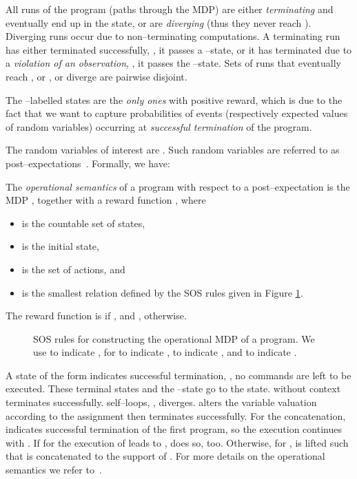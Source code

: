 All runs of the program (paths through the MDP) are either \emph{terminating} and eventually end up in the \sink state, or are \emph{diverging} (thus they never reach \sink).
Diverging runs occur due to non--terminating computations.
A terminating run has either terminated successfully, \ie, it passes a \exit--state, or it has terminated due to a \emph{violation of an observation}, \ie, it passes the --state.
Sets of runs that eventually reach \undesired, or \sink, or diverge are pairwise disjoint. 

\noindent The \exit--labelled states are the \emph{only ones} with positive reward, which is due to the fact that we want to capture probabilities of events (respectively expected values of random variables) occurring at \emph{successful termination} of the program.

The random variables of interest are .
Such random variables are referred to as post--expectations~\cite{McIver:2004}. 
Formally, we have:
\begin{definition}
The \emph{operational semantics} of a \cpGCL program  with respect to a post--expectation  is the MDP ,  together with a reward function , where
\begin{itemize}
\item is the countable set of states,
\item  is the initial state,
\item  is the set of actions, and
\item  is the smallest relation defined by the SOS rules given in Figure \ref{fig:sos-rules}.
\end{itemize}
The reward function is  if , and , otherwise.
\end{definition}
\begin{figure}[t]
\scriptsize
\normalsize
\caption{
SOS rules for constructing the operational MDP of a \cpGCL program.
We use  to indicate ,  for  to indicate ,  to indicate , and  to indicate .
}
\label{fig:sos-rules}
\end{figure}
A state of the form  indicates successful termination, \ie, no commands are left to be executed.
These terminal states and the \undesired--state go to the \sink state. 
\Skip without context terminates successfully.
\Abort self--loops, \ie, diverges. 
 alters the variable valuation according to the assignment then terminates successfully. 
For the concatenation,  indicates successful termination of the first program, so the execution continues with .
If for  the execution of  leads to ,  does so, too.
Otherwise, for ,  is lifted such that  is concatenated to the support of . For more details on the operational semantics we refer to~\cite{DBLP:journals/pe/GretzKM14}.

